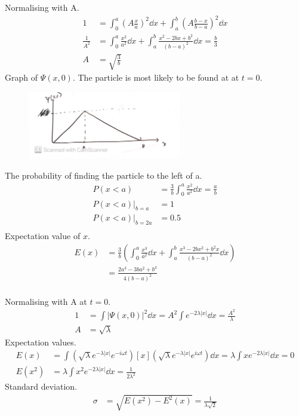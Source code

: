 \documentclass[newpage]{homework}
\begin{document}
\question
Normalising with A.
\begin{align*}
    1	&=	\int_0^a (A\frac{x}{a})^2 \dd{x} + \int_a^b (A\frac{b-x}{b-a})^2 \dd{x}	\\
    \frac{1}{A^2}    &=  \int_0^a \frac{x^2}{a^2} \dd{x} + \int_a^b \frac{x^2-2bx+b^2}{(b-a)^2} \dd{x} =	\frac{b}{3}	\\
    A   &=  \boxed{\sqrt{\frac{3}{b}}}
\end{align*}
Graph of $\Psi(x,0)$. The particle is most likely to be found at  at $t=0$.
\begin{figure}[htbp]
    \centering
    \includegraphics[width=0.6\textwidth]{2b.jpg}
\end{figure}

The probability of finding the particle to the left of a.
\begin{align*}
    P(x < a)	&=	\frac{3}{b} \int_0^a \frac{x^2}{a^2} \dd{x}
    = \boxed{\frac{a}{b}}   \\
    P(x < a)|_{b=a}  &=  1   \\
    P(x < a)|_{b=2a} &=  0.5    \\
\end{align*}
Expectation value of $x$.
\begin{align*}
    E(x)	&=	\frac{3}{b} \left(  \int_0^a \frac{x^3}{a^2} \dd{x} + \int_a^b \frac{x^3-2bx^2+b^2x}{(b-a)^2} \dd{x}  \right)	\\
        &=	\boxed{\frac{2a^3 - 3ba^2 + b^3}{4(b-a)^2}}	\\
\end{align*}

\question
Normalising with A at $t=0$.
\begin{align*}
    1	&=	\int |\Psi(x,0)|^2	\dd{x} = A^2 \int e^{-2\lambda |x|} \dd{x} = \frac{A^2}{\lambda} \\
    A   &=  \boxed{\sqrt{\lambda}}
\end{align*}
Expectation values.
\begin{align*}
    E(x)	&=  \int (\sqrt{\lambda} e^{-\lambda|x|} e^{-i \omega t})[x](\sqrt{\lambda} e^{-\lambda|x|} e^{i \omega t})  \dd{x}
    =  \lambda \int xe^{-2\lambda|x|}  \dd{x}
    = \boxed{0} \\
    E(x^2)  &=  \lambda \int x^2 e^{-2\lambda|x|}  \dd{x}
    = \boxed{\frac{1}{2\lambda^2}}
\end{align*}
Standard deviation.
\begin{align*}
    \sigma	&=	\sqrt{E(x^2) - E^2(x)}	= \boxed{\frac{1}{\lambda\sqrt{2}}}
\end{align*}
\end{document}
